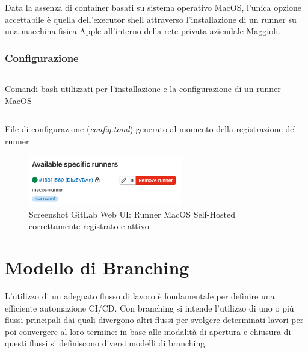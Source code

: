 Data la assenza di container basati su sistema operativo MacOS, l'unica opzione accettabile è quella dell'executor shell attraverso l'installazione di un runner su una macchina fisica Apple all'interno della rete privata aziendale Maggioli.

\subsubsection{Configurazione}

\begin{listing}[H]
\inputminted{bash}{code/4-macos-runner-setup}
\caption{Comandi bash utilizzati per l'installazione e la configurazione di un runner MacOS}
\end{listing}

\begin{listing}[H]
\inputminted{toml}{code/4-macos-runner-config}
\caption{File di configurazione (\textit{config.toml}) generato al momento della registrazione del runner}
\end{listing}

\begin{figure}[H]
\centering
\includegraphics[width=0.6\textwidth]{img/Screenshot 2022-07-07 at 11.40.13.png}
\caption{Screenshot GitLab Web UI: Runner MacOS Self-Hosted correttamente registrato e attivo}
\end{figure}

\section{Modello di Branching}
L'utilizzo di un adeguato flusso di lavoro è fondamentale per definire una efficiente automazione CI/CD. Con branching si intende l'utilizzo di uno o più flussi principali dai quali divergono altri flussi per svolgere determinati lavori per poi convergere al loro termine: in base alle modalità di apertura e chiusura di questi flussi si definiscono diversi modelli di branching.

